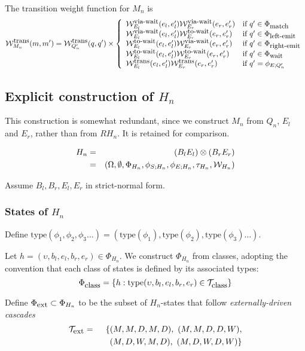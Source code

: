 \documentclass{article}
\newcommand{\seclabel}[1]{\label{sec.#1}}
\newcommand\compose{}
\newcommand\fork{\otimes}
\newcommand\States{\Phi}
\newcommand\statesof[1]{\States_{#1}}
\newcommand\Transitions{\tau}
\newcommand\transitionsof[1]{\Transitions_{#1}}
\newcommand\startstateof[1]{\phi_{S;#1}}
\newcommand\laststateof[1]{\phi_{E;#1}}
\newcommand\weight{{\cal W}}
\newcommand\weightfunof[1]{\weight_{#1}}
\newcommand\transweightfun[1]{\weightfunof{#1}^{\mbox{\small trans}}}
\newcommand\transviawait[1]{\weightfunof{#1}^{\mbox{\small via-wait}}}
\newcommand\transtowait[1]{\weightfunof{#1}^{\mbox{\small to-wait}}}
\newcommand\statetype{\mbox{type}}
\newcommand\typeset[1]{{\cal T}_{\mbox{\small #1}}}
\newcommand\stateset[1]{\statesof{\mbox{\small #1}}}
\newcommand\hstate{(\upsilon,b_l,e_l,b_r,e_r)}
\newcommand\externalsuffix{ext}
\newcommand\waitsuffix{wait}
\newcommand\externalcascades{\stateset{\externalsuffix}}
\newcommand\waitstates{\stateset{\waitsuffix}}
\newcommand\externaltypes{\typeset{\externalsuffix}}
\newcommand\matchsuffix{match}
\newcommand\leftemitsuffix{left-emit}
\newcommand\rightemitsuffix{right-emit}
\newcommand\matchstates{\stateset{\matchsuffix}}
\newcommand\leftemitstates{\stateset{\leftemitsuffix}}
\newcommand\rightemitstates{\stateset{\rightemitsuffix}}
\begin{document}
The transition weight function for $M_n$ is
\[
\transweightfun{M_n}(m,m') = \transweightfun{Q'_n}(q,q') \times \left\{
\begin{array}{ll}
\transviawait{E_l}(e_l,e'_l) \transviawait{E_r}(e_r,e'_r)
 & \mbox{if $q' \in \matchstates $} \\
\transviawait{E_l}(e_l,e'_l) \transtowait{E_r}(e_r,e'_r)
 & \mbox{if $q' \in \leftemitstates$} \\
\transtowait{E_l}(e_l,e'_l) \transviawait{E_r}(e_r,e'_r)
 & \mbox{if $q' \in \rightemitstates$} \\
\transtowait{E_l}(e_l,e'_l) \transtowait{E_r}(e_r,e'_r)
 & \mbox{if $q' \in \waitstates$} \\
\transweightfun{E_l}(e_l,e'_l) \transweightfun{E_r}(e_r,e'_r)
 & \mbox{if $q' = \laststateof{Q'_n}$}
\end{array}
\right.
\]


\subsection{Explicit construction of $H_n$}
\seclabel{Hn}
This construction is somewhat redundant, since we construct $M_n$ from $Q_n$, $E_l$ and $E_r$, rather than from $R \compose H_n$.
It is retained for comparison.

\begin{eqnarray*}
H_n & = & (B_l \compose E_l) \fork (B_r \compose E_r) \\
& = & (\Omega,\emptyset,\statesof{H_n},\startstateof{H_n},\laststateof{H_n},\transitionsof{H_n},\weightfunof{H_n}) \\
\end{eqnarray*}

Assume $B_l,B_r,E_l,E_r$ in strict-normal form.

\subsubsection{States of $H_n$}

Define $\statetype(\phi_1,\phi_2,\phi_3 \ldots) = (\statetype(\phi_1), \statetype(\phi_2), \statetype(\phi_3) \ldots)$.

Let $h=\hstate\in\statesof{H_n}$.
We construct $\statesof{H_n}$ from classes, adopting the convention that each class of states is defined by its associated types:
\[
\stateset{class} = \{ h: \statetype\hstate \in \typeset{class} \}
\]

Define $\externalcascades \subset \statesof{H_n}$ to be the subset of $H_n$-states that follow {\em externally-driven cascades}
\begin{eqnarray*}
\externaltypes & = & \{ (M,M,D,M,D),\ (M,M,D,D,W), \\
& & \quad (M,D,W,M,D),\ (M,D,W,D,W) \}
\end{eqnarray*}
\end{document}
